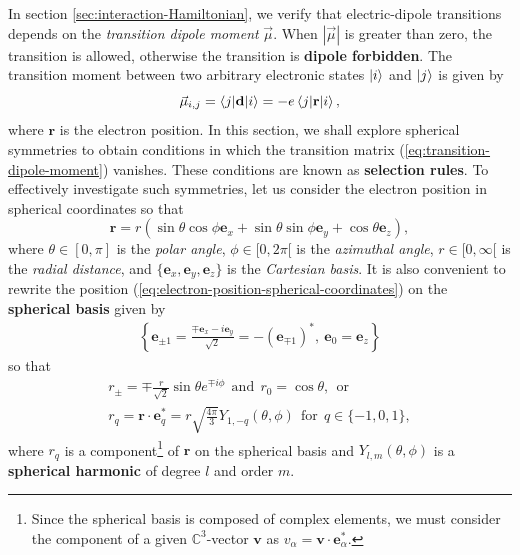 {In section \ref{sec:interaction-Hamiltonian}, we verify that electric-dipole transitions depends on the \textit{transition dipole moment} $ \vec{\mu} $. When $ |\vec{\mu}| $ is greater than zero, the transition is allowed, otherwise the transition is \textbf{dipole forbidden}. The transition moment between two arbitrary electronic states $ \ket{i} $ and $ \ket{j} $ is given by
\begin{equation}
	\vec{\mu}_{i,j} = \braket{j|\mathbf{d}|i} = -e \braket{j|\mathbf{r}|i},
	\label{eq:transition-dipole-moment}
\end{equation}
where $ \mathbf{r} $ is the electron position. In this section, we shall explore spherical symmetries to obtain conditions in which the transition matrix (\ref{eq:transition-dipole-moment}) vanishes. These conditions are known as \textbf{selection rules}. To effectively investigate such symmetries, let us consider the electron position in spherical coordinates so that
\begin{equation}
	\mathbf{r} = r\left(\sin\theta\cos\phi \mathbf{e}_x + \sin\theta\sin\phi \mathbf{e}_y + \cos\theta\mathbf{e}_z\right),
	\label{eq:electron-position-spherical-coordinates}
\end{equation}
where $ \theta \in [0, \pi] $ is the \textit{polar angle}, $ \phi \in [0, 2\pi[ $ is the \textit{azimuthal angle}, $ r \in [0, \infty[ $ is the \textit{radial distance}, and $ \{\mathbf{e}_x, \mathbf{e}_y, \mathbf{e}_z \} $ is the \textit{Cartesian basis}. It is also convenient to rewrite the position (\ref{eq:electron-position-spherical-coordinates}) on the \textbf{spherical basis} given by
\begin{gather}
	\left\{ \mathbf{e}_{\pm1} =  \frac{\mp\mathbf{e}_x - i\mathbf{e}_y}{\sqrt{2}} = -(\mathbf{e}_{\mp 1})^*,\ \mathbf{e}_0 = \mathbf{e}_z\right\}
	\label{eq:spherical-basis}
\end{gather}
so that
\begin{gather}
	r_{\pm} = \mp \frac{r}{\sqrt{2}}\sin\theta e^{\mp i \phi}\ \ \textrm{and}\ \ r_0 = \cos\theta,\ \ \textrm{or}\label{eq:position-vector-spherical-basis-1}
	\\
	r_{q} = \mathbf{r} \cdot \mathbf{e}_q^* = r \sqrt{\frac{4\pi}{3}} Y_{1, -q}(\theta, \phi)\ \ \textrm{for}\ \ q \in \{-1, 0, 1\},
	\label{eq:position-vector-spherical-basis-2}
\end{gather}
where $ r_{q} $ is a component\footnote{Since the spherical basis is composed of complex elements, we must consider the component of a given $\mathbb{C}^3$-vector $ \mathbf{v} $ as $ v_\alpha = \mathbf{v} \cdot \mathbf{e}_{\alpha}^* $.} of $ \mathbf{r} $ on the spherical basis and $ Y_{l, m}(\theta, \phi) $ is a \textbf{spherical harmonic} of degree $ l $ and order $ m $.

}
